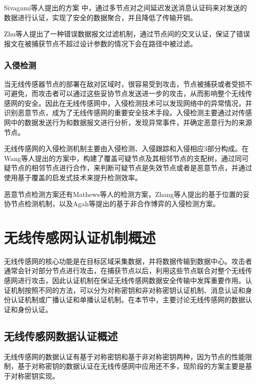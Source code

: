 Sivagami等人提出的方案 中，通过多节点对之间延迟发送消息认证码来对发送的数据进行认证，实现了安全的数据聚合，并且降低了传输开销。

Zhu等人提出了一种错误数据报文过滤机制，通过节点间的交叉认证，保证了错误报文在被捕获节点不超过设计参数的情况下会在路径中被过滤。

\subsubsection{入侵检测}
当无线传感器节点的部署在敌对区域时，很容易受到攻击，节点被捕获或者受损不可避免，而攻击者可以通过这些妥协节点发送进一步的攻击，从而影响整个无线传感网的安全。因此在无线传感网中，入侵检测技术可以发现网络中的异常情况，并识别恶意节点，成为了无线传感网的重要安全技术手段。入侵检测主要通过对传感网中的数据发送行为和数据报文进行分析，发现异常事件，并确定恶意行为的来源节点。

无线传感网的入侵检测机制主要由入侵检测、入侵跟踪和入侵相应3部分构成。在Wang等人提出的方案中，构建了覆盖可疑节点及其相邻节点的支配树，通过同可疑节点的相邻节点进行合作，来判断可疑节点是失效节点或者是恶意节点，并通过使用基于覆盖的启发式技术来提升检测效率。

恶意节点检测方案还有Mathews等人的检测方案，Zhang等人提出的基于位置的妥协节点检测机制，以及Agah等提出的基于非合作博弈的入侵检测方案。

\section{无线传感网认证机制概述}
无线传感网的核心功能是在目标区域采集数据，并将数据传输到数据中心。攻击者通常会针对部分节点进行攻击，在捕获节点以后，利用这些节点联合对整个无线传感网进行攻击，因此认证机制在保证无线传感网数据安全传输中发挥重要作用。认证机制按照不同的方法，可以分为对称密钥和非对称密钥认证机制、消息认证和身份认证机制或广播认证和单播认证机制。在本节中，主要讨论无线传感网的数据认证和身份认证。

\subsection{无线传感网数据认证概述}
无线传感网的数据认证有基于对称密钥和基于非对称密钥两种，因为节点的性能限制，基于对称密钥的数据认证在无线传感网中应用还不多，现阶段的方案主要是基于对称密钥实现。

